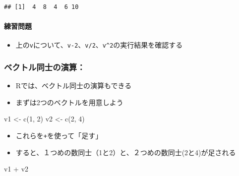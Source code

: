 \documentclass[
]{book}
\newenvironment{Shaded}{\begin{snugshade}}{\end{snugshade}}
\newcommand{\DecValTok}[1]{\textcolor[rgb]{0.00,0.00,0.81}{#1}}
\newcommand{\FunctionTok}[1]{\textcolor[rgb]{0.00,0.00,0.00}{#1}}
\newcommand{\NormalTok}[1]{#1}
\newcommand{\OtherTok}[1]{\textcolor[rgb]{0.56,0.35,0.01}{#1}}
\newcommand{\SpecialCharTok}[1]{\textcolor[rgb]{0.00,0.00,0.00}{#1}}
\providecommand{\tightlist}{%
  \setlength{\itemsep}{0pt}\setlength{\parskip}{0pt}}
\begin{document}
\begin{verbatim}
## [1]  4  8  4  6 10
\end{verbatim}

\hypertarget{ux7df4ux7fd2ux554fux984c-2}{%
\paragraph*{練習問題}\label{ux7df4ux7fd2ux554fux984c-2}}

\begin{itemize}
\tightlist
\item
  上の\texttt{v}について、\texttt{v-2}、\texttt{v/2}、\texttt{v\^{}2}の実行結果を確認する
\end{itemize}

\hypertarget{ux30d9ux30afux30c8ux30ebux540cux58ebux306eux6f14ux7b97}{%
\subsubsection*{ベクトル同士の演算：}\label{ux30d9ux30afux30c8ux30ebux540cux58ebux306eux6f14ux7b97}}

\begin{itemize}
\tightlist
\item
  Rでは、ベクトル同士の演算もできる
\item
  まずは2つのベクトルを用意しよう
\end{itemize}

\begin{Shaded}
\begin{Highlighting}[]
\NormalTok{v1 }\OtherTok{\textless{}{-}} \FunctionTok{c}\NormalTok{(}\DecValTok{1}\NormalTok{, }\DecValTok{2}\NormalTok{) }
\NormalTok{v2 }\OtherTok{\textless{}{-}} \FunctionTok{c}\NormalTok{(}\DecValTok{2}\NormalTok{, }\DecValTok{4}\NormalTok{) }
\end{Highlighting}
\end{Shaded}

\begin{itemize}
\tightlist
\item
  これらを\texttt{+}を使って「足す」
\item
  すると、１つめの数同士（1と2）と、２つめの数同士(2と4)が足される
\end{itemize}

\begin{Shaded}
\begin{Highlighting}[]
\NormalTok{v1 }\SpecialCharTok{+}\NormalTok{ v2}
\end{Highlighting}
\end{Shaded}
\end{document}
